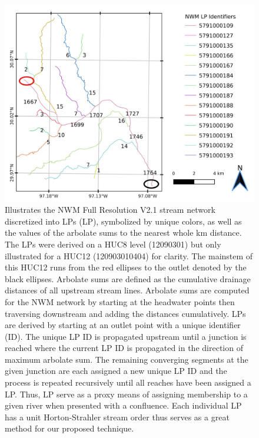 \documentclass[draft]{dependencies/agujournal2019}
\begin{document}
\begin{figure}[H]
\centering
\includegraphics[scale=1.0]{figures/level_path_methods.jpg}
\caption{Illustrates the NWM Full Resolution V2.1 stream network discretized into LPs (LP), symbolized by unique colors, as well as the values of the arbolate sums to the nearest whole km distance.
The LPs were derived on a HUC8 level (12090301) but only illustrated for a HUC12 (120903010404) for clarity.
The mainstem of this HUC12 runs from the red ellipses to the outlet denoted by the black ellipses.
Arbolate sums are defined as the cumulative drainage distances of all upstream stream lines.
Arbolate sums are computed for the NWM network by starting at the headwater points then traversing downstream and adding the distances cumulatively. 
LPs are derived by starting at an outlet point with a unique identifier (ID).
The unique LP ID is propagated upstream until a junction is reached where the current LP ID is propagated in the direction of maximum arbolate sum.
The remaining converging segments at the given junction are each assigned a new unique LP ID and the process is repeated recursively until all reaches have been assigned a LP.
Thus, LP serve as a proxy means of assigning membership to a given river when presented with a confluence.
Each individual LP has a unit Horton-Strahler stream order thus serves as a great method for our proposed technique.
}
\label{fig:level_path_methods}
\end{figure}
%
%
\end{document}
